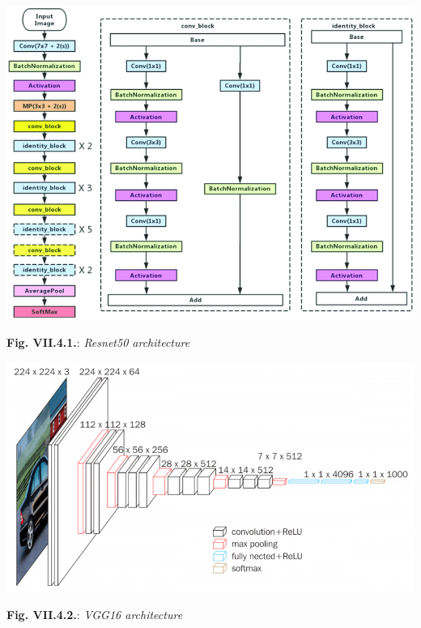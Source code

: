 \documentclass[11pt, a4papper]{report}
\theoremstyle{plain}
\theoremstyle{definition}
\theoremstyle{definition}
\theoremstyle{proposition}
\begin{document}
\begin{center}
\includegraphics[scale=0.38]{resnet50.png}
\end{center}
\begin{center}
\textbf{Fig. VII.4.1.}: \textit{Resnet50 architecture}
\end{center}

\begin{center}
\includegraphics[scale=0.5]{vgg16.png}
\end{center}
\begin{center}
\textbf{Fig. VII.4.2.}: \textit{VGG16 architecture}
\end{center}


\end{document}
